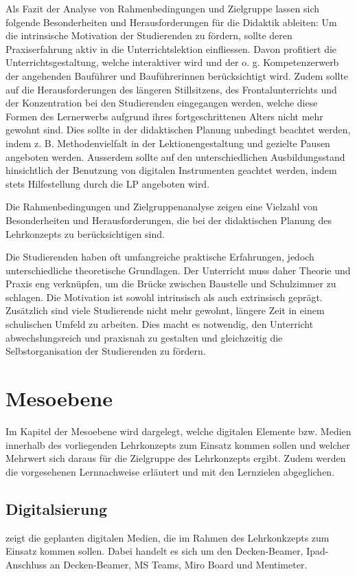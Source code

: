 \documentclass[
11pt,
captions=tableheading,
smallheadings,
headsepline,
footsepline, 
parskip=half-,
]{scrartcl}
\begin{document}
Als Fazit der Analyse von Rahmenbedingungen und Zielgruppe lassen sich folgende Besonderheiten und Herausforderungen für die Didaktik ableiten:
Um die intrinsische Motivation der Studierenden zu fördern, sollte deren Praxiserfahrung aktiv in die Unterrichtslektion einfliessen. Davon profitiert die Unterrichtsgestaltung, welche interaktiver wird und der o. g. Kompetenzerwerb der angehenden Bauführer und Bauführerinnen berücksichtigt wird. Zudem sollte auf die Herausforderungen des längeren Stillsitzens, des Frontalunterrichts und der Konzentration bei den Studierenden eingegangen werden, welche diese Formen des Lernerwerbs aufgrund ihres fortgeschrittenen Alters nicht mehr gewohnt sind. Dies sollte in der didaktischen Planung unbedingt beachtet werden, indem z. B. Methodenvielfalt in der Lektionengestaltung und gezielte Pausen angeboten werden. Ausserdem sollte auf den unterschiedlichen Ausbildungsstand hinsichtlich der Benutzung von digitalen Instrumenten geachtet werden, indem stets Hilfestellung durch die LP angeboten wird.

Die Rahmenbedingungen und Zielgruppenanalyse zeigen eine Vielzahl von Besonderheiten und Herausforderungen, die bei der didaktischen Planung des Lehrkonzepts zu berücksichtigen sind.

Die Studierenden haben oft umfangreiche praktische Erfahrungen, jedoch unterschiedliche theoretische Grundlagen. Der Unterricht muss daher Theorie und Praxis eng verknüpfen, um die Brücke zwischen Baustelle und Schulzimmer zu schlagen. Die Motivation ist sowohl intrinsisch als auch extrinsisch geprägt. Zusätzlich sind viele Studierende nicht mehr gewohnt, längere Zeit in einem schulischen Umfeld zu arbeiten. Dies macht es notwendig, den Unterricht abwechslungsreich und praxisnah zu gestalten und gleichzeitig die Selbstorganisation der Studierenden zu fördern. 



\section{Mesoebene}
Im Kapitel der Mesoebene wird dargelegt, welche digitalen Elemente bzw. Medien innerhalb des vorliegenden Lehrkonzepts zum Einsatz kommen sollen und welcher Mehrwert sich daraus für die Zielgruppe des Lehrkonzepts ergibt. Zudem werden die vorgesehenen Lernnachweise erläutert und mit den Lernzielen abgeglichen. 

\subsection{Digitalsierung}
 zeigt die geplanten digitalen Medien, die im Rahmen des Lehrkonkzepts zum Einsatz kommen sollen. Dabei handelt es sich um den Decken-Beamer, Ipad-Anschluss an Decken-Beamer, MS Teams, Miro Board und Mentimeter.
\end{document}
